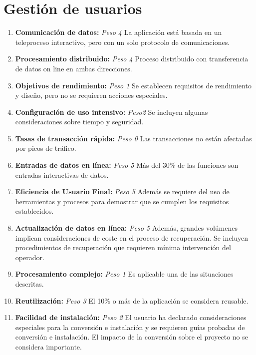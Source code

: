 \documentclass[11pt,a4paper,spanish,twoside]{book}
\begin{document}
\section{Gestión de usuarios}
\begin{enumerate}[{\bf 1.}]

\item {\bf Comunicación de datos:} \emph{Peso 4} La aplicación está basada en
  un teleproceso interactivo, pero con un solo protocolo de comunicaciones.

\item {\bf Procesamiento distribuido:} \emph{Peso 4} Proceso distribuido
  con transferencia de datos on line en ambas direcciones. 

\item {\bf Objetivos de rendimiento:} \emph{Peso 1} Se establecen requisitos
  de rendimiento y diseño, pero no se requieren acciones especiales.

\item {\bf Configuración de uso intensivo:} \emph{Peso2} Se incluyen algunas
  consideraciones sobre tiempo y seguridad. 

\item {\bf Tasas de transacción rápida:} \emph{Peso 0} Las transacciones no
  están afectadas por picos de tráfico. 

\item {\bf Entradas de datos en línea:} \emph{Peso 5} Más del 30\% de las
  funciones son entradas interactivas de datos. 

\item {\bf Eficiencia de Usuario Final:} \emph{Peso 5} Además se requiere del
  uso de herramientas y procesos para demostrar que se cumplen los requisitos
  establecidos.

\item {\bf Actualización de datos en línea:} \emph{Peso 5} Además, grandes
  volúmenes implican consideraciones de coste en el proceso de
  recuperación. Se incluyen procedimientos de recuperación que requieren
  mínima intervención del operador. 

\item {\bf Procesamiento complejo:} \emph{Peso 1} Es aplicable una de las
  situaciones descritas. 

\item {\bf Reutilización:} \emph{Peso 3} El 10\% o más de la aplicación se
  considera reusable. 

\item {\bf Facilidad de instalación:} \emph{Peso 2} El usuario ha declarado
  consideraciones especiales para la conversión e instalación y se requieren
  guías probadas de conversión e instalación. El impacto de la conversión
  sobre el proyecto no se considera importante. 


\end{enumerate}
\end{document}
